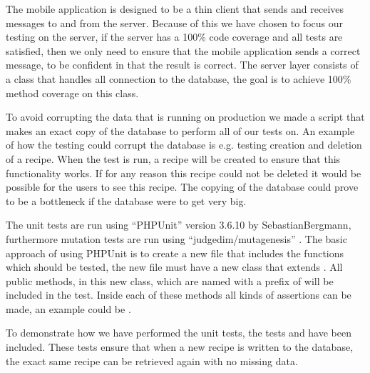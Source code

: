 The mobile application is designed to be a thin client that sends and receives messages to and from the server. 
Because of this we have chosen to focus our testing on the server, if the server has a 100\% code coverage and all tests are satisfied, then we only need to ensure that the mobile application sends a correct message, to be confident in that the result is correct.
The server layer consists of a class that handles all connection to the database, the goal is to achieve 100\% method coverage on this class.

To avoid corrupting the data that is running on production we made a script that makes an exact copy of the database to perform all of our tests on. An example of how the testing could corrupt the database is e.g. testing creation and deletion of a recipe. 
When the test is run, a recipe will be created to ensure that this functionality works. 
If for any reason this recipe could not be deleted it would be possible for the users to see this recipe. 
The copying of the database could prove to be a bottleneck if the database were to get very big.

The unit tests are run using ``PHPUnit'' version 3.6.10 by Sebastian\linebreak Bergmann\cite{phpunit}, furthermore mutation tests are run using ``judgedim/mutagenesis'' \cite{mutagenesis}. The basic approach of using PHPUnit is to create a new file that includes the functions which should be tested, the new file must have a new class that extends . All public methods, in this new class, which are named with a prefix of  will be included in the test. Inside each of these methods all kinds of assertions can be made, an example could be .

To demonstrate how we have performed the unit tests, the tests \linebreak{} and  have been included. These tests ensure that when a new recipe is written to the database, the exact same recipe can be retrieved again with no missing data.

